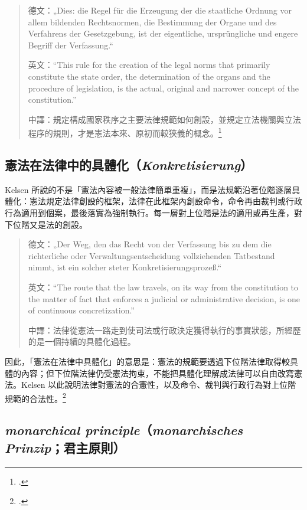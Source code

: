 \begin{quote}
德文：„Dies: die Regel für die Erzeugung der die staatliche Ordnung vor allem bildenden Rechtsnormen, die Bestimmung der Organe und des Verfahrens der Gesetzgebung, ist der eigentliche, ursprüngliche und engere Begriff der Verfassung.``

英文：``This rule for the creation of the legal norms that primarily constitute the state order, the determination of the organs and the procedure of legislation, is the actual, original and narrower concept of the constitution.''

中譯：規定構成國家秩序之主要法律規範如何創設，並規定立法機關與立法程序的規則，才是憲法本來、原初而較狹義的概念。\footcites[36]{kelsen1929}[27--28]{kelsen2015}
\end{quote}

\subsection{\texorpdfstring{憲法在法律中的具體化（\emph{Konkretisierung}）}{憲法在法律中的具體化（Konkretisierung）}}

Kelsen 所說的不是「憲法內容被一般法律簡單重複」，而是法規範沿著位階逐層具體化：憲法規定法律創設的框架，法律在此框架內創設命令，命令再由裁判或行政行為適用到個案，最後落實為強制執行。每一層對上位階是法的適用或再生產，對下位階又是法的創設。

\begin{quote}
德文：„Der Weg, den das Recht von der Verfassung bis zu dem die richterliche oder Verwaltungsentscheidung vollziehenden Tatbestand nimmt, ist ein solcher steter Konkretisierungsprozeß.``

英文：``The route that the law travels, on its way from the constitution to the matter of fact that enforces a judicial or administrative decision, is one of continuous concretization.''

中譯：法律從憲法一路走到使司法或行政決定獲得執行的事實狀態，所經歷的是一個持續的具體化過程。
\end{quote}

因此，「憲法在法律中具體化」的意思是：憲法的規範要透過下位階法律取得較具體的內容；但下位階法律仍受憲法拘束，不能把具體化理解成法律可以自由改寫憲法。Kelsen 以此說明法律對憲法的合憲性，以及命令、裁判與行政行為對上位階規範的合法性。\footcites[23--25]{kelsen2015}[31--33]{kelsen1929}

\subsection{\texorpdfstring{\emph{monarchical principle}（\emph{monarchisches Prinzip}；君主原則）}{monarchical principle（monarchisches Prinzip；君主原則）}}


